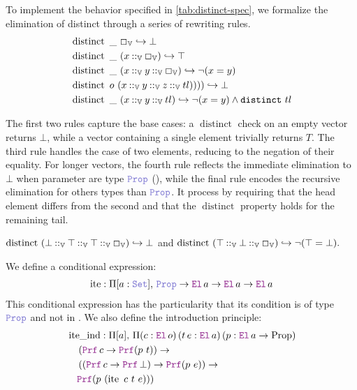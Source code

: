 \begin{definition}
To implement the behavior specified in \cref{tab:distinct-spec}, we formalize the elimination of distinct through a series of rewriting rules.
\begin{align*}
&\mathop{\mathrm{distinct}}~ \mathbin{\_}~\Box_\mathbb{V} \hookrightarrow \bot \\
&\mathop{\mathrm{distinct}}~\mathbin{\_}~ (x \mathbin{::}_\mathbb{V} \Box_\mathbb{V}) \hookrightarrow \top \\
&\mathop{\mathrm{distinct}}~\mathbin{\_}~ (x \mathbin{::}_\mathbb{V} y \mathbin{::}_\mathbb{V}  \Box_\mathbb{V}) \hookrightarrow \neg (x = y) \\
&\mathop{\mathrm{distinct}}~o~(x \mathbin{::}_\mathbb{V} y \mathbin{::}_\mathbb{V} z \mathbin{::}_\mathbb{V} tl)))) \hookrightarrow \bot \\
&\mathop{\mathrm{distinct}}~\_~(x \mathbin{::}_\mathbb{V} y \mathbin{::}_\mathbb{V} tl) \hookrightarrow \neg (x = y) \land \texttt{\upshape{distinct}}~tl
\end{align*}

The first two rules capture the base cases: a \(\mathop{\mathrm{distinct}}\) check on an empty vector returns $\bot$, while a vector containing a single element trivially returns $T$.
The third rule handles the case of two elements, reducing to the negation of their equality.
For longer vectors, the fourth rule reflects the immediate elimination to  $\bot$ when parameter are type $\prop$ (),
while the final rule encodes the recursive elimination for others types than $\prop$. It process by requiring that the head element differs from the second and that the
\(\mathop{\mathrm{distinct}}\) property holds for the remaining tail.
\end{definition}

\begin{example}
\(
    \mathop{\mathrm{distinct}}~(\bot \mathbin{::}_\mathbb{V} \top \mathbin{::}_\mathbb{V} \top \mathbin{::}_\mathbb{V} \Box_\mathbb{V}) \hookrightarrow \bot
\)
and
\(
    \mathop{\mathrm{distinct}}~(\top \mathbin{::}_\mathbb{V} \bot \mathbin{::}_\mathbb{V} \Box_\mathbb{V}) \hookrightarrow \neg (\top = \bot).
\)
\end{example}

\begin{definition}
We define a conditional expression:
\begin{align*}
\mathop{\mathrm{ite}} : \Pi [a: \set],\, \prop \ra \el\,a \ra \el\,a \ra \el\,a
\end{align*}
This conditional expression has the particularity that its condition is of type $\prop$ and not in \B.
We also define the introduction principle:
\begin{align*}
&\mathop{\mathrm{ite\_ind}} : \Pi [a],\, \Pi (c : \el\,o)\, (t\, e : \el\,a)\, (p : \el\,a \ra \mathrm{Prop})\\
&\quad\left( \prf\,c \ra \prf(p~t) \right) \ra \\
&\quad\left( (\prf\,c \ra \prf\,\bot) \ra \prf(p~e) \right) \ra \\
&\quad\prf(p~(\mathop{\mathrm{ite}}~c~t~e)))
\end{align*}
\end{definition}

